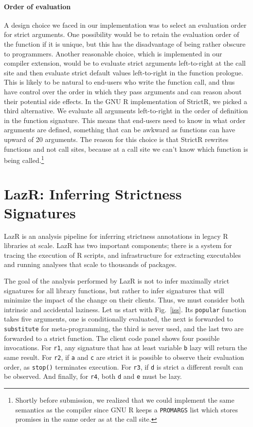 \documentclass[review,nonacm,screen,acmsmall,anonymous=true]{acmart}
\renewcommand{\c}[1]{\lstinline |#1|\xspace}
\newcommand{\strictr}{{\sf StrictR}\xspace}
\newcommand{\lazr}{{\sf LazR}\xspace}
\begin{document}
\paragraph{Order of evaluation} A design choice we faced in our implementation
was to select an evaluation order for strict arguments. One possibility would be
to retain the evaluation order of the function if it is unique, but this
has the disadvantage of being rather obscure to programmers. Another reasonable
choice, which is implemented in our compiler extension, would be to evaluate
strict arguments left-to-right at the call site and then evaluate strict default
values left-to-right in the function prologue. This is likely to be natural to
end-users who write the function call, and thus have control over the order in
which they pass arguments and can reason about their potential side effects. In
the GNU R implementation of \strictr, we picked a third alternative. We evaluate
all arguments left-to-right in the order of definition in the function
signature. This means that end-users need to know in what order arguments are
defined, something that can be awkward as functions can have upward of 20
arguments. The reason for this choice is that \strictr rewrites functions and
not call sites, because at a call site we can't know which function is being
called.\footnote{Shortly before submission, we realized that we could implement
  the same semantics as the compiler since GNU R keeps a \c{PROMARGS} list which
  stores promises in the same order as at the call site.}

\newpage%
\section{LazR: Inferring Strictness Signatures}\label{sec:lazr}

\lazr is an analysis pipeline for inferring strictness annotations in legacy R
libraries at scale. \lazr has two important components; there is a system for
tracing the execution of R scripts, and infrastructure for extracting
executables and running analyses that scale to thousands of packages.

The goal of the analysis performed by \lazr is not to infer maximally strict
signatures for all library functions, but rather to infer signatures that will
minimize the impact of the change on their clients. Thus, we must consider both
intrinsic and accidental laziness. Let us start with Fig.~\ref{iss}. Its
\c{popular} function takes five arguments, one is conditionally evaluated, the
next is forwarded to \c{substitute} for meta-programming, the third is never
used, and the last two are forwarded to a strict function. The client code panel
shows four possible invocations. For \c{r1}, any signature that has at least
variable \c b lazy will return the same result. For \c{r2}, if \c a and \c c are
strict it is possible to observe their evaluation order, as \c{stop()}
terminates execution. For \c{r3}, if \c{d} is strict a different result can be
observed. And finally, for \c{r4}, both \c d and \c{e} must be lazy.
\end{document}
